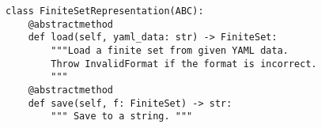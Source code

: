 \par\begin{minipage}{60ex}
\begin{verbatim}
class FiniteSetRepresentation(ABC):
    @abstractmethod
    def load(self, yaml_data: str) -> FiniteSet:
        """Load a finite set from given YAML data.
        Throw InvalidFormat if the format is incorrect.
        """
    @abstractmethod
    def save(self, f: FiniteSet) -> str:
        """ Save to a string. """
\end{verbatim}
\end{minipage}\par